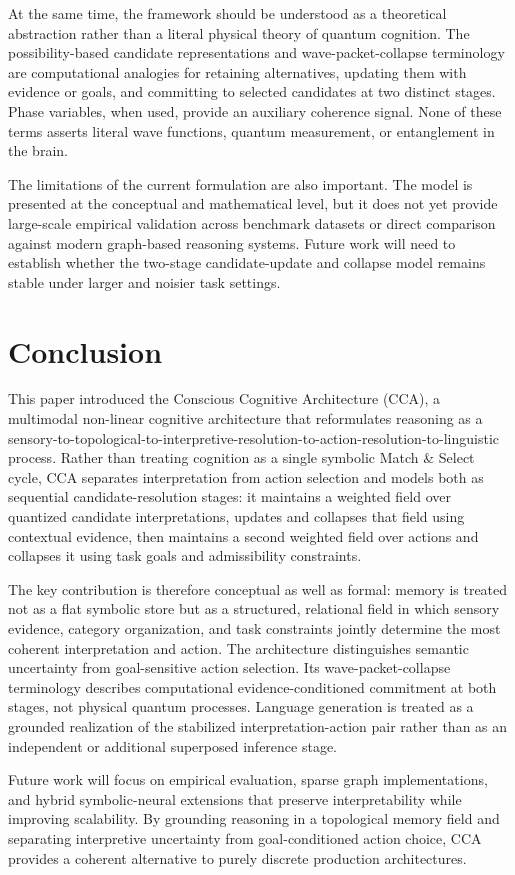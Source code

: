 \documentclass[10pt,journal,compsoc]{IEEEtran}
\begin{document}
At the same time, the framework should be understood as a theoretical abstraction rather than a literal physical theory of quantum cognition. The possibility-based candidate representations and wave-packet-collapse terminology are computational analogies for retaining alternatives, updating them with evidence or goals, and committing to selected candidates at two distinct stages. Phase variables, when used, provide an auxiliary coherence signal. None of these terms asserts literal wave functions, quantum measurement, or entanglement in the brain.

The limitations of the current formulation are also important. The model is presented at the conceptual and mathematical level, but it does not yet provide large-scale empirical validation across benchmark datasets or direct comparison against modern graph-based reasoning systems. Future work will need to establish whether the two-stage candidate-update and collapse model remains stable under larger and noisier task settings.

\section{Conclusion}

This paper introduced the Conscious Cognitive Architecture (CCA), a multimodal non-linear cognitive architecture that reformulates reasoning as a sensory-to-topological-to-interpretive-resolution-to-action-resolution-to-linguistic process. Rather than treating cognition as a single symbolic Match \& Select cycle, CCA separates interpretation from action selection and models both as sequential candidate-resolution stages: it maintains a weighted field over quantized candidate interpretations, updates and collapses that field using contextual evidence, then maintains a second weighted field over actions and collapses it using task goals and admissibility constraints.

The key contribution is therefore conceptual as well as formal: memory is treated not as a flat symbolic store but as a structured, relational field in which sensory evidence, category organization, and task constraints jointly determine the most coherent interpretation and action. The architecture distinguishes semantic uncertainty from goal-sensitive action selection. Its wave-packet-collapse terminology describes computational evidence-conditioned commitment at both stages, not physical quantum processes. Language generation is treated as a grounded realization of the stabilized interpretation-action pair rather than as an independent or additional superposed inference stage.

Future work will focus on empirical evaluation, sparse graph implementations, and hybrid symbolic-neural extensions that preserve interpretability while improving scalability. By grounding reasoning in a topological memory field and separating interpretive uncertainty from goal-conditioned action choice, CCA provides a coherent alternative to purely discrete production architectures.



\end{document}
